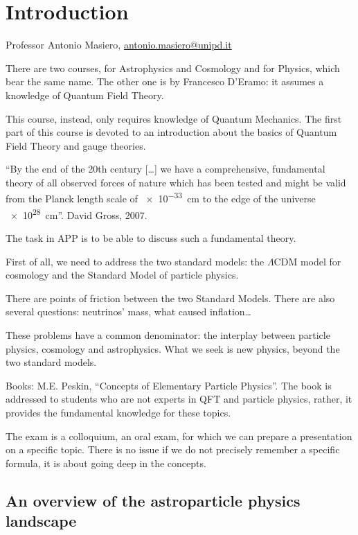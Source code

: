 \documentclass[main.tex]{subfiles}
\begin{document}

\section*{Introduction}

Professor Antonio Masiero, \url{antonio.masiero@unipd.it}

There are two courses, for Astrophysics and Cosmology and for Physics, which bear the same name. 
The other one is by Francesco D'Eramo: it assumes a knowledge of Quantum Field Theory. 

This course, instead, only requires knowledge of Quantum Mechanics. 
The first part of this course is devoted to an introduction about the basics of Quantum Field Theory and gauge theories.

``By the end of the 20th century [\dots] we have a comprehensive, fundamental theory of all observed forces of nature which has been tested and might be valid from the Planck length scale of \SI{e-33}{cm} to the edge of the universe \SI{e28}{cm}''. David Gross, 2007. 

The task in APP is to be able to discuss such a fundamental theory. 

First of all, we need to address the two standard models: the \(\Lambda \)CDM model for cosmology and the Standard Model of particle physics.

There are points of friction between the two Standard Models.
There are also several questions: neutrinos' mass, what caused inflation\dots 

These problems have a common denominator: the interplay between particle physics, cosmology and astrophysics.
What we seek is new physics, beyond the two standard models. 

Books: M.E. Peskin, ``Concepts of Elementary Particle Physics''. The book is addressed to students who are not experts in QFT and particle physics, rather, it provides the fundamental knowledge for these topics.

The exam is a colloquium, an oral exam, for which we can prepare a presentation on a specific topic. 
There is no issue if we do not precisely remember a specific formula, it is about going deep in the concepts.

\subsection*{An overview of the astroparticle physics landscape}
\end{document}
